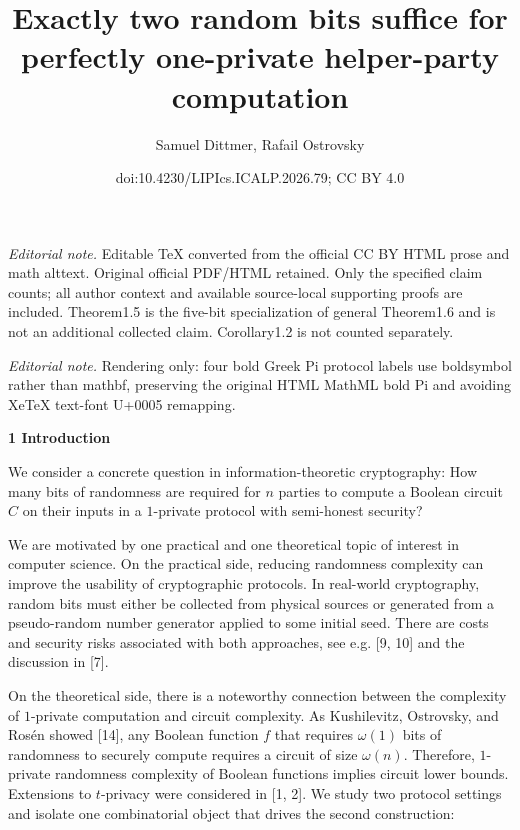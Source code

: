 \documentclass[10pt,a4paper]{article}
\title{Exactly two random bits suffice for perfectly one-private helper-party computation}
\author{Samuel Dittmer, Rafail Ostrovsky}
\date{doi:10.4230/LIPIcs.ICALP.2026.79; CC BY 4.0}
\begin{document}
\maketitle
\noindent\textit{Editorial note.} Editable TeX converted from the official CC BY HTML prose and math alttext. Original official PDF/HTML retained. Only the specified claim counts; all author context and available source-local supporting proofs are included. Theorem1.5 is the five-bit specialization of general Theorem1.6 and is not an additional collected claim. Corollary1.2 is not counted separately.\par\medskip
\noindent\textit{Editorial note.} Rendering only: four bold Greek Pi protocol labels use boldsymbol rather than mathbf, preserving the original HTML MathML bold Pi and avoiding XeTeX text-font U+0005 remapping.\par\medskip


\par\medskip\noindent\textbf{
1 Introduction}\par




We consider a concrete question in information-theoretic cryptography: How many bits of randomness are required for $n$ parties to compute a Boolean circuit $C$ on their inputs in a $1$-private protocol with semi-honest security?\par




We are motivated by one practical and one theoretical topic of interest in computer science. On the practical side, reducing randomness complexity can improve the usability of cryptographic protocols. In real-world cryptography, random bits must either be collected from physical sources or generated from a pseudo-random number generator applied to some initial seed. There are costs and security risks associated with both approaches, see e.g. [9, 10] and the discussion in [7].\par




On the theoretical side, there is a noteworthy connection between the complexity of $1$-private computation and circuit complexity. As Kushilevitz, Ostrovsky, and Rosén showed [14], any Boolean function $f$ that requires $\omega(1)$ bits of randomness to securely compute requires a circuit of size $\omega(n)$. Therefore, $1$-private randomness complexity of Boolean functions implies circuit lower bounds. Extensions to $t$-privacy were considered in [1, 2].
We study two protocol settings and isolate one combinatorial object that drives the second construction:\par
\end{document}

